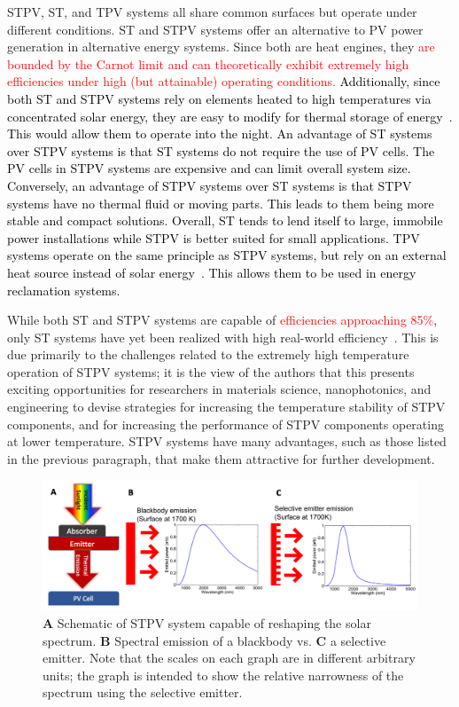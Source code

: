 \documentclass[review]{elsarticle}
\begin{document}
STPV, ST, and TPV systems all share common surfaces but operate under
different conditions.  ST and STPV systems offer an alternative to PV
power generation in alternative energy systems.  Since both are heat
engines, they \textcolor{red}{are bounded by the Carnot limit and can
theoretically exhibit extremely high efficiencies under high (but attainable) operating conditions.}
\textcolor{black}{Additionally, since both ST and STPV systems rely on
elements heated to high temperatures via concentrated solar energy, they
are easy to modify for thermal storage of
energy~\cite{SteadyStateAnalysis,Night_time_Performance}.  This would
allow them to operate into the night.  An advantage of ST systems over
STPV systems is that ST systems do not require the use of PV cells.  The
PV cells in STPV systems are expensive and can limit overall system size.
Conversely, an advantage of STPV systems over ST systems is that STPV
systems have no thermal fluid or moving parts.  This leads to them being
more stable and compact solutions.  Overall, ST tends to lend itself to
large, immobile power installations while STPV is better suited for small
applications.  TPV systems operate on the same principle as STPV systems,
but rely on an external heat source instead of solar
energy~\cite{Prototype_TPV}.  This allows them to be used in energy
reclamation systems.}

While both ST and STPV systems are capable of
\textcolor{red}{efficiencies approaching 85\%}, only ST systems have yet been
realized with high real-world efficiency~\cite{RF_OptExp_2009, RKR_RenEnRev_2013, nnnNature}.  This is due primarily to the challenges
related to the extremely high temperature operation of STPV systems; it is
the view of the authors that this presents exciting opportunities for
researchers in materials science, nanophotonics, and engineering to devise
strategies for increasing the temperature stability of STPV components,
and for increasing the performance of STPV components operating at lower
temperature.  STPV systems have many advantages, such as those listed in
the previous paragraph, that make them attractive for further
development.

\begin{figure}[ht!]
	\includegraphics[width=1\textwidth]{gfig_bbs_schem.png}
	\caption{\label{gfig_bbs} {\bf A} Schematic of STPV system capable of
reshaping the solar spectrum.  {\bf B} Spectral emission of a blackbody vs. {\bf C} a selective emitter.  Note that the scales on each graph are in different arbitrary units; the graph is intended to show the relative narrowness of the spectrum using the selective emitter.}
\end{figure}
\end{document}
